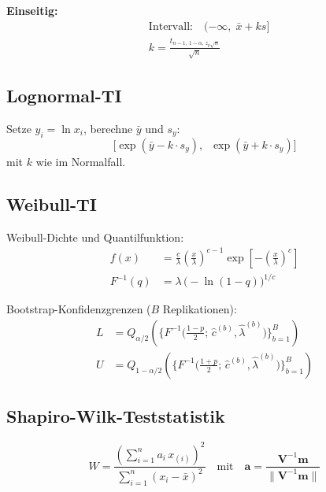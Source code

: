 \documentclass[10pt,a4paper,twocolumn]{article}
\theoremstyle{definition}
\newcommand{\xbar}{\bar{x}}
\begin{document}
\textbf{Einseitig:}
\begin{align}
    &\text{Intervall:} \quad (-\infty,\; \xbar + ks] \\
    &k = \frac{t_{n-1,\,1-\alpha,\,z_p\sqrt{n}}}{\sqrt{n}}
\end{align}

\subsection{Lognormal-TI}

Setze $y_i = \ln x_i$, berechne $\bar{y}$ und $s_y$:
\begin{equation}
    \Big[\exp(\bar{y} - k \cdot s_y),\;\;
          \exp(\bar{y} + k \cdot s_y)\Big]
\end{equation}
mit $k$ wie im Normalfall.

\subsection{Weibull-TI}

Weibull-Dichte und Quantilfunktion:
\begin{align}
    f(x) &= \frac{c}{\lambda}
    \left(\frac{x}{\lambda}\right)^{\!c-1}
    \exp\!\left[-\left(\frac{x}{\lambda}\right)^{\!c}\right] \\[4pt]
    F^{-1}(q) &= \lambda\,\big(-\ln(1-q)\big)^{1/c}
\end{align}

Bootstrap-Konfidenzgrenzen ($B$ Replikationen):
\begin{align}
    L &= Q_{\alpha/2}\!\left(\big\{
        F^{-1}\!\big(\tfrac{1-p}{2};\, \hat{c}^{(b)}, \hat{\lambda}^{(b)}\big)
    \big\}_{b=1}^B\right) \\
    U &= Q_{1-\alpha/2}\!\left(\big\{
        F^{-1}\!\big(\tfrac{1+p}{2};\, \hat{c}^{(b)}, \hat{\lambda}^{(b)}\big)
    \big\}_{b=1}^B\right)
\end{align}

\subsection{Shapiro-Wilk-Teststatistik}

\begin{equation}
    W = \frac{\left(\sum_{i=1}^n a_i\, x_{(i)}\right)^2}
    {\sum_{i=1}^n (x_i - \xbar)^2}
    \quad\text{mit}\quad
    \mathbf{a} = \frac{\mathbf{V}^{-1}\mathbf{m}}
    {\|\mathbf{V}^{-1}\mathbf{m}\|}
\end{equation}
\end{document}
